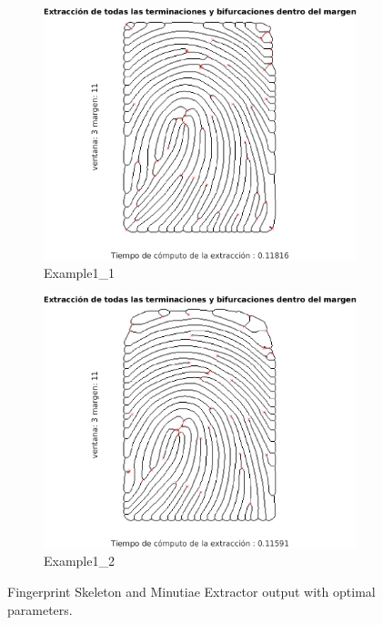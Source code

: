 \documentclass[11pt]{article}
\begin{document}
\begin{figure}[h!]
  \centering
       \begin{subfigure}[t]{0.45\textwidth}
         \centering
         \includegraphics[scale=0.5]{img/extraction_optim_1}
         \caption{Example1\_1}
     \end{subfigure}%
     \quad
     \begin{subfigure}[t]{0.45\textwidth}
         \centering
         \includegraphics[scale=0.5]{img/extraction_optim_2}
         \caption{Example1\_2}
     \end{subfigure}
    \caption{Fingerprint Skeleton and Minutiae Extractor output with optimal parameters.}
    \label{fig:ex5b}
\end{figure}
\end{document}
